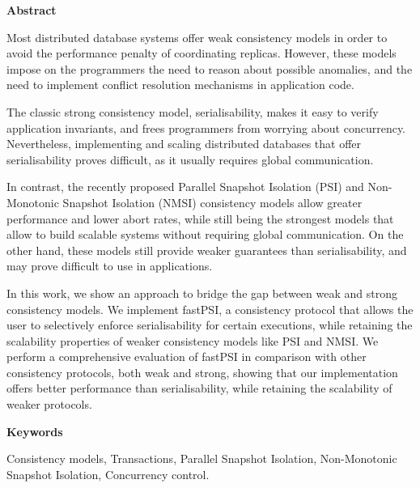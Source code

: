 \newpage

\begin{center}
{\bf \Huge Abstract}
\end{center}

\vspace{1cm}

Most distributed database systems offer weak consistency models in order to avoid
the performance penalty of coordinating replicas. However, these models impose
on the programmers the need to reason about possible anomalies, and the need
to implement conflict resolution mechanisms in application code.

The classic strong consistency model, serialisability, makes it easy to verify
application invariants, and frees programmers from worrying about concurrency.
Nevertheless, implementing and scaling distributed databases that offer
serialisability proves difficult, as it usually requires global communication.

In contrast, the recently proposed Parallel Snapshot Isolation (PSI) and
Non-Monotonic Snapshot Isolation (NMSI) consistency models allow greater
performance and lower abort rates, while still being the strongest models that
allow to build scalable systems without requiring global communication.
On the other hand, these models still provide weaker guarantees than
serialisability, and may prove difficult to use in applications.

In this work, we show an approach to bridge the gap between weak and strong
consistency models. We implement fastPSI, a consistency protocol that allows
the user to selectively enforce serialisability for certain executions, while
retaining the scalability properties of weaker consistency models like PSI and
NMSI. We perform a comprehensive evaluation of fastPSI in comparison with other
consistency protocols, both weak and strong, showing that our implementation
offers better performance than serialisability, while retaining the scalability
of weaker protocols.

\vspace{1cm}

\begin{center}
{\bf \Large Keywords}
\end{center}

\vspace{0.5cm}

Consistency models, Transactions, Parallel Snapshot Isolation, Non-Monotonic Snapshot Isolation, Concurrency control.
